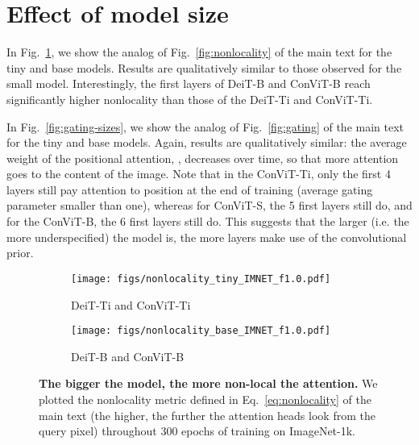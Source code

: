 \documentclass[a4paper,11pt,twocolumn]{article}
\begin{document}
\section{Effect of model size}
\label{app:nonlocality}

In Fig.~\ref{fig:nonlocality-sizes}, we show the analog of Fig.~\ref{fig:nonlocality} of the main text for the tiny and base models. Results are qualitatively similar to those observed for the small model. Interestingly, the first layers of DeiT-B and ConViT-B reach significantly higher nonlocality than those of the DeiT-Ti and ConViT-Ti.

In Fig.~\ref{fig:gating-sizes}, we show the analog of Fig.~\ref{fig:gating} of the main text for the tiny and base models. Again, results are qualitatively similar: the average weight of the positional attention, , decreases over time, so that more attention goes to the content of the image. Note that in the ConViT-Ti, only the first 4 layers still pay attention to position at the end of training (average gating parameter smaller than one), whereas for ConViT-S, the 5 first layers still do, and for the ConViT-B, the 6 first layers still do. This suggests that the larger (i.e. the more underspecified) the model is, the more layers make use of the convolutional prior.

\begin{figure}[h]
    \begin{subfigure}[b]{\linewidth}
    \centering
    \texttt{[image: figs/nonlocality\_tiny\_IMNET\_f1.0.pdf]}
    \caption{DeiT-Ti and ConViT-Ti}
    \end{subfigure}
    \begin{subfigure}[b]{\linewidth}
    \centering
    \texttt{[image: figs/nonlocality\_base\_IMNET\_f1.0.pdf]}
    \caption{DeiT-B and ConViT-B}
    \end{subfigure}
    \caption{\textbf{The bigger the model, the more non-local the attention.} We plotted the nonlocality metric defined in Eq.~\ref{eq:nonlocality} of the main text (the higher, the further the attention heads look from the query pixel) throughout 300 epochs of training on ImageNet-1k. }
    \label{fig:nonlocality-sizes}
\end{figure}
\end{document}
